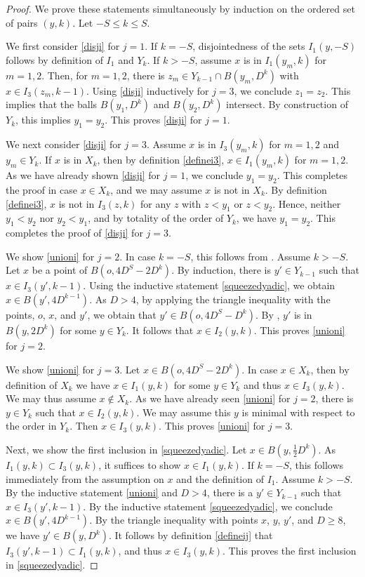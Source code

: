 \begin{proof}
\leanok
We prove these statements simultaneously by induction on the ordered set of pairs $(y,k)$. Let $-S\le k\le S$.

We first consider \eqref{disji} for $j=1$. If $k=-S$, disjointedness of the sets $I_1(y,-S)$ follows by definition of $I_1$ and $Y_k$. If $k>-S$, assume $x$ is in $I_1(y_m,k)$ for $m=1,2$. Then, for $m=1,2$, there is $z_m\in Y_{k-1}\cap B(y_m,D^k)$ with $x\in I_3(z_m,k-1)$. Using \eqref{disji} inductively for $j=3$, we conclude $z_1=z_2$. This implies that the balls $B(y_1, D^k)$ and $B(y_2, D^k)$ intersect. By construction of $Y_k$, this implies $y_1=y_2$. This proves \eqref{disji} for $j=1$.

We next consider \eqref{disji} for $j=3$. Assume $x$ is in $I_3(y_m,k)$ for $m=1,2$ and $y_m\in Y_k$. If $x$ is in $X_k$, then by definition \eqref{definei3}, $x\in I_1(y_m,k)$ for $m=1,2$. As we have already shown \eqref{disji} for $j=1$, we conclude $y_1=y_2$. This completes the proof in case $x\in X_k$, and we may assume $x$ is not in $X_k$. By definition \eqref{definei3}, $x$ is not in $I_3(z,k)$ for any $z$ with $z<y_1$ or $z<y_2$. Hence, neither $y_1<y_2$ nor $y_2<y_1$, and by totality of the order of $Y_k$, we have $y_1=y_2$. This completes the proof of \eqref{disji} for $j=3$.

We show \eqref{unioni} for $j=2$. In case $k=-S$, this follows from . Assume $k>-S$. Let $x$ be a point of $B(o, 4D^S-2D^k)$. By induction, there is $y'\in Y_{k-1}$ such that $x\in I_3(y',k-1)$. Using the inductive statement \eqref{squeezedyadic}, we obtain $x\in B(y',4D^{k-1})$. As $D>4$, by applying the triangle inequality with the points, $o$, $x$, and $y'$, we obtain that $y'\in B(o, 4D^S-D^k)$. By , $y'$ is in $B(y,2D^k)$ for some $y\in Y_k$. It follows that $x\in I_2(y,k)$. This proves \eqref{unioni} for $j=2$.

We show \eqref{unioni} for $j=3$. Let $x\in B(o, 4D^S-2D^k)$. In case $x\in X_k$, then by definition of $X_k$ we have $x\in I_1(y,k)$ for some $y\in Y_k$ and thus $x\in I_3(y,k)$. We may thus assume $x\not\in X_k$. As we have already seen \eqref{unioni} for $j=2$, there is $y\in Y_k$ such that $x\in I_2(y,k)$. We may assume this $y$ is minimal with respect to the order in $Y_k$. Then $x\in I_3(y,k)$. This proves \eqref{unioni} for $j=3$.

Next, we show the first inclusion in \eqref{squeezedyadic}. Let $x\in B(y,\frac 12 D^k)$. As $I_1(y,k)\subset I_3(y,k)$, it suffices to show $x\in I_1(y,k)$. If $k=-S$, this follows immediately from the assumption on $x$ and the definition of $I_1$. Assume $k>-S$. By the inductive statement \eqref{unioni} and $D>4$, there is a $y'\in Y_{k-1}$ such that $x\in I_3(y',k-1)$. By the inductive statement \eqref{squeezedyadic}, we conclude $x\in B(y',4D^{k-1})$. By the triangle inequality with points $x$, $y$, $y'$, and $D\geq8$, we have $y'\in B(y,D^k)$. It follows by definition \eqref{defineij} that $I_3(y',k-1)\subset I_1(y,k)$, and thus $x\in I_3(y,k)$. This proves the first inclusion in \eqref{squeezedyadic}.


\end{proof}

